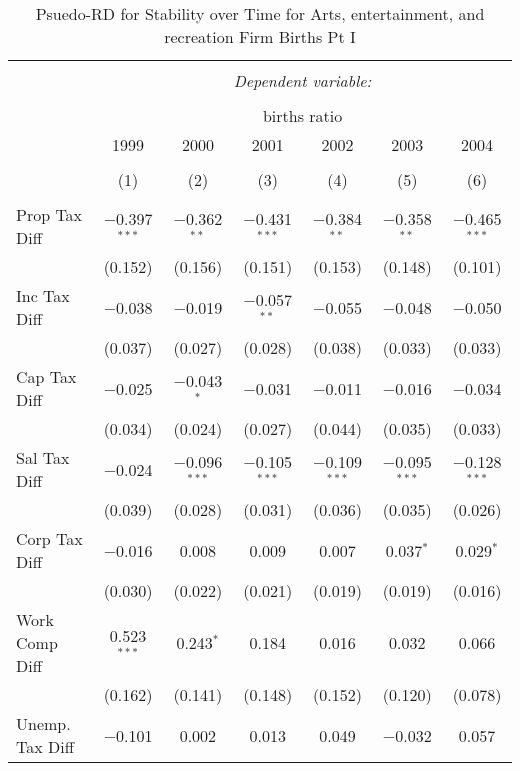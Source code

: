 
\begin{table}[!htbp] \centering 
  \caption{Psuedo-RD for Stability over Time for  Arts, entertainment, and recreation Firm Births Pt I} 
  \label{71year} 
\small 
\begin{tabular}{@{\extracolsep{5pt}}lcccccc} 
\\[-1.8ex]\hline 
\hline \\[-1.8ex] 
 & \multicolumn{6}{c}{\textit{Dependent variable:}} \\ 
\cline{2-7} 
\\[-1.8ex] & \multicolumn{6}{c}{births ratio} \\ 
 & 1999 & 2000 & 2001 & 2002 & 2003 & 2004 \\ 
\\[-1.8ex] & (1) & (2) & (3) & (4) & (5) & (6)\\ 
\hline \\[-1.8ex] 
 Prop Tax Diff & $-$0.397$^{***}$ & $-$0.362$^{**}$ & $-$0.431$^{***}$ & $-$0.384$^{**}$ & $-$0.358$^{**}$ & $-$0.465$^{***}$ \\ 
  & (0.152) & (0.156) & (0.151) & (0.153) & (0.148) & (0.101) \\ 
  Inc Tax Diff & $-$0.038 & $-$0.019 & $-$0.057$^{**}$ & $-$0.055 & $-$0.048 & $-$0.050 \\ 
  & (0.037) & (0.027) & (0.028) & (0.038) & (0.033) & (0.033) \\ 
  Cap Tax Diff & $-$0.025 & $-$0.043$^{*}$ & $-$0.031 & $-$0.011 & $-$0.016 & $-$0.034 \\ 
  & (0.034) & (0.024) & (0.027) & (0.044) & (0.035) & (0.033) \\ 
  Sal Tax Diff & $-$0.024 & $-$0.096$^{***}$ & $-$0.105$^{***}$ & $-$0.109$^{***}$ & $-$0.095$^{***}$ & $-$0.128$^{***}$ \\ 
  & (0.039) & (0.028) & (0.031) & (0.036) & (0.035) & (0.026) \\ 
  Corp Tax Diff & $-$0.016 & 0.008 & 0.009 & 0.007 & 0.037$^{*}$ & 0.029$^{*}$ \\ 
  & (0.030) & (0.022) & (0.021) & (0.019) & (0.019) & (0.016) \\ 
  Work Comp Diff & 0.523$^{***}$ & 0.243$^{*}$ & 0.184 & 0.016 & 0.032 & 0.066 \\ 
  & (0.162) & (0.141) & (0.148) & (0.152) & (0.120) & (0.078) \\ 
  Unemp. Tax Diff & $-$0.101 & 0.002 & 0.013 & 0.049 & $-$0.032 & 0.057 \\ 

\end{tabular}
\end{table}
